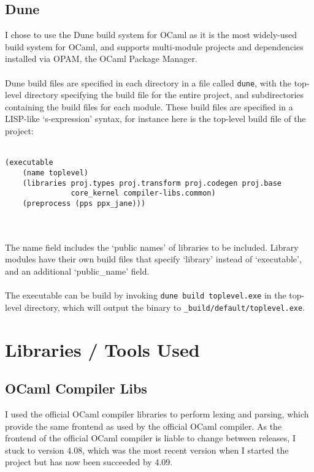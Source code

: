 \documentclass[12pt,twoside,notitlepage]{report}
\newcommand{\textinline}{\texttt}
\newcommand{\cfbox}[2]{%
	\colorlet{currentcolor}{.}%
	{\color{#1}%
		\fbox{\color{currentcolor}#2}}%
}
\newcommand\note[1]{\noindent\cfbox{blue}{\parbox{\textwidth}{\textcolor{blue}{#1}}}}
\begin{document}
\subsection{Dune}
I chose to use the Dune\cite{Dune} build system for OCaml as it is the most widely-used build system for OCaml, and supports multi-module projects and dependencies installed via OPAM, the OCaml Package Manager.
\\\\
Dune build files are specified in each directory in a file called \textinline{dune}, with the top-level directory specifying the build file for the entire project, and subdirectories containing the build files for each module. These build files are specified in a LISP-like `s-expression' syntax, for instance here is the top-level build file of the project:
\\\\
\begin{minipage}{\linewidth}

\begin{verbatim}
(executable
    (name toplevel)
    (libraries proj.types proj.transform proj.codegen proj.base
               core_kernel compiler-libs.common)
    (preprocess (pps ppx_jane)))
\end{verbatim}
\end{minipage}
\\\\
The name field includes the `public names' of libraries to be included. Library modules have their own build files that specify `library' instead of `executable', and an additional `public\_name' field.
\\\\
The executable can be build by invoking \textinline{dune build toplevel.exe} in the top-level directory, which will output the binary to \textinline{_build/default/toplevel.exe}.

\note{Easy to shorten?}

\section{Libraries / Tools Used}
\subsection{OCaml Compiler Libs}
I used the official OCaml compiler \cite{OCaml} libraries to perform lexing and parsing, which provide the same frontend as used by the official OCaml compiler. As the frontend of the official OCaml compiler is liable to change between releases, I stuck to version 4.08, which was the most recent version when I started the project but has now been succeeded by 4.09.
\end{document}
